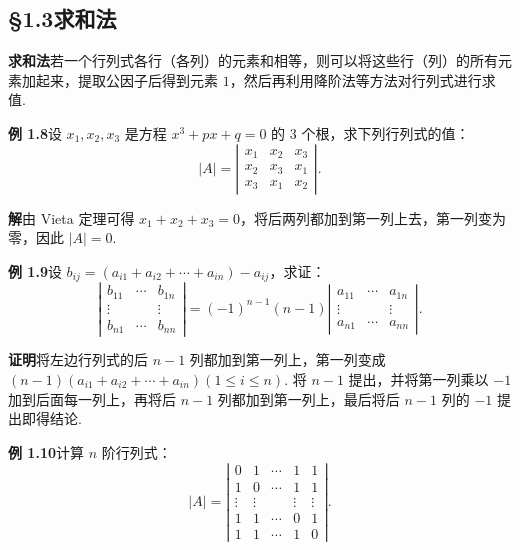 \documentclass[UTF8, 12pt, fontset=fandol, oneside]{ctexart}
\begin{document}
\subsection*{§1.3\quad 求和法}

\noindent\textbf{求和法}\quad 若一个行列式各行（各列）的元素和相等，则可以将这些行（列）的所有元素加起来，提取公因子后得到元素 $1$，然后再利用降阶法等方法对行列式进行求值.

\noindent\textbf{例 1.8}\quad 设 $x_1,x_2,x_3$ 是方程 $x^3+px+q=0$ 的 3 个根，求下列行列式的值：
\[
|A|=\left|\begin{array}{ccc}
x_1 & x_2 & x_3\\
x_2 & x_3 & x_1\\
x_3 & x_1 & x_2
\end{array}\right|.
\]

\noindent\textbf{解}\quad 由 Vieta 定理可得 $x_1+x_2+x_3=0$，将后两列都加到第一列上去，第一列变为零，因此 $|A|=0$.

\noindent\textbf{例 1.9}\quad 设 $b_{ij}=(a_{i1}+a_{i2}+\cdots+a_{in})-a_{ij}$，求证：
\[
\left|\begin{array}{ccc}
b_{11} & \cdots & b_{1n}\\
\vdots &        & \vdots\\
b_{n1} & \cdots & b_{nn}
\end{array}\right|
=(-1)^{n-1}(n-1)
\left|\begin{array}{ccc}
a_{11} & \cdots & a_{1n}\\
\vdots &        & \vdots\\
a_{n1} & \cdots & a_{nn}
\end{array}\right|.
\]

\noindent\textbf{证明}\quad 将左边行列式的后 $n-1$ 列都加到第一列上，第一列变成 $(n-1)(a_{i1}+a_{i2}+\cdots+a_{in})(1\le i\le n)$. 将 $n-1$ 提出，并将第一列乘以 $-1$ 加到后面每一列上，再将后 $n-1$ 列都加到第一列上，最后将后 $n-1$ 列的 $-1$ 提出即得结论.

\noindent\textbf{例 1.10}\quad 计算 $n$ 阶行列式：
\[
|A|=\left|\begin{array}{ccccc}
0 & 1 & \cdots & 1 & 1\\
1 & 0 & \cdots & 1 & 1\\
\vdots & \vdots &        & \vdots & \vdots\\
1 & 1 & \cdots & 0 & 1\\
1 & 1 & \cdots & 1 & 0
\end{array}\right|.
\]
\end{document}
